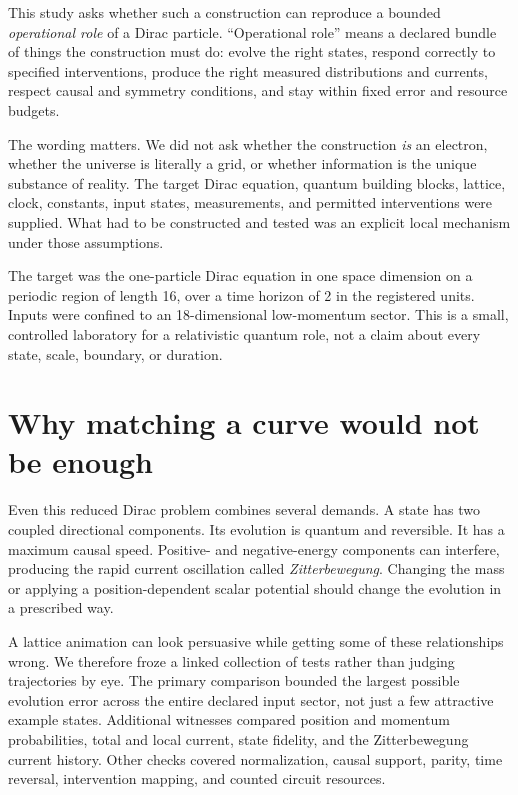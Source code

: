 \documentclass[11pt]{article}
\begin{document}
This study asks whether such a construction can reproduce a bounded
\emph{operational role} of a Dirac particle.  ``Operational role'' means a
declared bundle of things the construction must do: evolve the right states,
respond correctly to specified interventions, produce the right measured
distributions and currents, respect causal and symmetry conditions, and stay
within fixed error and resource budgets.

The wording matters.  We did not ask whether the construction \emph{is} an
electron, whether the universe is literally a grid, or whether information is
the unique substance of reality.  The target Dirac equation, quantum building
blocks, lattice, clock, constants, input states, measurements, and permitted
interventions were supplied.  What had to be constructed and tested was an
explicit local mechanism under those assumptions.

The target was the one-particle Dirac equation in one space dimension on a
periodic region of length 16, over a time horizon of 2 in the registered units.
Inputs were confined to an 18-dimensional low-momentum sector.  This is a
small, controlled laboratory for a relativistic quantum role, not a claim
about every state, scale, boundary, or duration.

\section{Why matching a curve would not be enough}

Even this reduced Dirac problem combines several demands.  A state has two
coupled directional components.  Its evolution is quantum and reversible.  It
has a maximum causal speed.  Positive- and negative-energy components can
interfere, producing the rapid current oscillation called
\emph{Zitterbewegung}.  Changing the mass or applying a position-dependent
scalar potential should change the evolution in a prescribed way.

A lattice animation can look persuasive while getting some of these
relationships wrong.  We therefore froze a linked collection of tests rather
than judging trajectories by eye.  The primary comparison bounded the largest
possible evolution error across the entire declared input sector, not just a
few attractive example states.  Additional witnesses compared position and
momentum probabilities, total and local current, state fidelity, and the
Zitterbewegung current history.  Other checks covered normalization, causal
support, parity, time reversal, intervention mapping, and counted circuit
resources.
\end{document}
